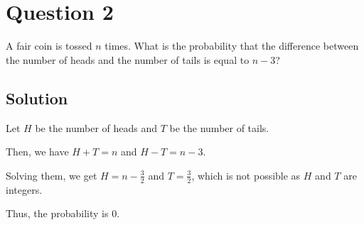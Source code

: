 \section*{Question 2}

A fair coin is tossed \(n\) times.
What is the probability that the difference between the number of heads and the number of tails is equal to \(n - 3\)?

\subsection*{Solution}

Let \(H\) be the number of heads and \(T\) be the number of tails.

Then, we have \(H + T = n\) and \(H - T = n - 3\).

Solving them, we get \(H = n - \frac{3}{2}\) and \(T = \frac{3}{2}\), which is not possible as \(H\) and \(T\) are integers.

Thus, the probability is \(\boxed{0}\).

